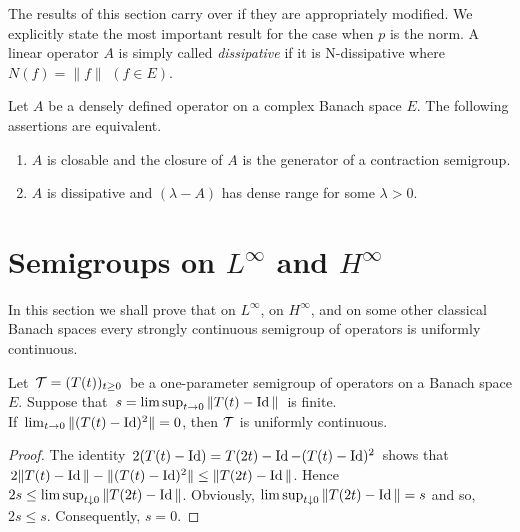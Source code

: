The results of this section carry over if they are appropriately modified.
We explicitly state the most important result for the case when $p$ is the norm.
A linear operator $A$ is simply called \emph{dissipative} if it is N-dissipative where $N(f) = \|f\|$ $(f \in E)$.

\begin{theorem}\label{thm:a2-2.13}
Let $A$ be a densely defined operator on a complex Banach space $E$.
The following assertions are equivalent.
\begin{enumerate}[\upshape (a)]	
\item \label{thm:a2-2.13.1}
$A$ is closable and the closure of $A$ is the generator of a contraction semigroup.
\item \label{thm:a2-2.13.2}
$A$ is dissipative and $(\lambda - A)$ has dense range for some $\lambda > 0$.
\end{enumerate}
\end{theorem}
\section{Semigroups on \texorpdfstring{$L^{\infty}$}{L-infty}  and \texorpdfstring{$H^{\infty}$}{H-infty} \label{sec:a2-3}}
\hspace{1cm}{\Large by Heinrich P. Lotz}
\vspace{.5cm}
\newline
In this section we shall prove that on $L^\infty$, on $H^\infty$, and on some other classical Banach spaces every strongly continuous semigroup of operators is uniformly continuous.
\begin{lemma}\label{lem:a2-3.1}
Let\, $\mathcal{T} = (T(t))_{t\geq 0}$\, be a one-parameter semigroup of operators on a Banach space $E$.
Suppose that\, $s = \lim\sup_{t\to 0} \|T(t) - \operatorname{Id}\|$\, is finite.\\
If \,$\lim_{t\to 0} \|(T(t) - \operatorname{Id})^2\| = 0$, then $\mathcal{T}$ is uniformly continuous.
\end{lemma}

\begin{proof}
The identity \,$2(T(t) - \operatorname{Id}) = T(2t) - \operatorname{Id} - (T(t) - \operatorname{Id})^2$\, shows
that \\ \,$2\|T(t) - \operatorname{Id}\| - \|(T(t) - \operatorname{Id})^{2} \| \leq \|T(2t) - \operatorname{Id}\|$. 
Hence $2s \leq \lim \sup_{t \downarrow 0} \|T(2t) - \operatorname{Id}\|$.
Obviously, $\lim \sup_{t \downarrow 0} \|T(2t) - \operatorname{Id}\| = s$ and so, $2s \leq s$.
Consequently, $s = 0$.
\end{proof}

